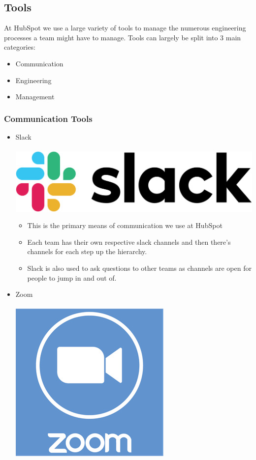 \documentclass[11pt]{article} %
\begin{document}
\subsection{Tools}
At HubSpot we use a large variety of tools to manage the numerous engineering processes a team might have to manage. Tools can largely be split into 3 main categories: \begin{itemize} \item Communication \item Engineering \item Management \end{itemize}
\subsubsection{\textbf{Communication Tools}}
\begin{itemize}
\item Slack\\\\
\includegraphics[scale=0.07]{slack.png}
\begin{itemize}
\item This is the primary means of communication we use at HubSpot
\item Each team has their own respective slack channels and then there's channels for each step up the hierarchy.
\item Slack is also used to ask questions to other teams as channels are open for people to jump in and out of.
\end{itemize}
\item Zoom\\\\
\includegraphics[scale=0.2]{zoom.png}

\end{itemize}
\end{document}
